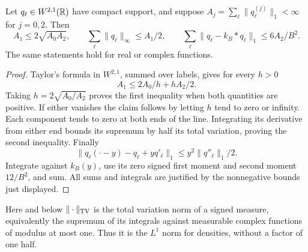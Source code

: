 \begin{lemma}
\label{lem:all-label-interpolation}
Let $q_\ell\in W^{2,1}(\mathbb R)$ have compact support, and suppose
$A_j=\sum_\ell\|q_\ell^{(j)}\|_1<\infty$ for $j=0,2$.
Then
\begin{equation}\label{eq:all-label-interpolation}
 A_1\le2\sqrt{A_0A_2},\qquad
 \sum_\ell\|q_\ell\|_\infty\le A_1/2,
 \qquad
 \sum_\ell\|q_\ell-k_B*q_\ell\|_1\le6A_2/B^2.
\end{equation}
The same statements hold for real or complex functions.
\end{lemma}
\begin{proof}
Taylor's formula in $W^{2,1}$, summed over labels, gives for every $h>0$
\[
 A_1\le 2A_0/h+hA_2/2.
\]
Taking $h=2\sqrt{A_0/A_2}$ proves the first inequality when both
quantities are positive. If either vanishes the claim follows by
letting $h$ tend to zero or infinity. Each component tends to zero at
both ends of the line. Integrating its derivative from either end
bounds its supremum by half its total variation, proving the second
inequality. Finally
\[
 \|q_\ell(\cdot-y)-q_\ell+yq'_\ell\|_1
                       \le y^2\|q''_\ell\|_1/2.
\]
Integrate against $k_B(y)$, use its zero signed first moment and second
moment $12/B^2$, and sum. All sums and integrals are justified by the
nonnegative bounds just displayed.
\end{proof}

Here and below $\|\cdot\|_{\operatorname{TV}}$ is the total variation norm of a signed
measure, equivalently the supremum of its integrals against measurable
complex functions of modulus at most one. Thus it is the $L^1$ norm
for densities, without a factor of one half.

